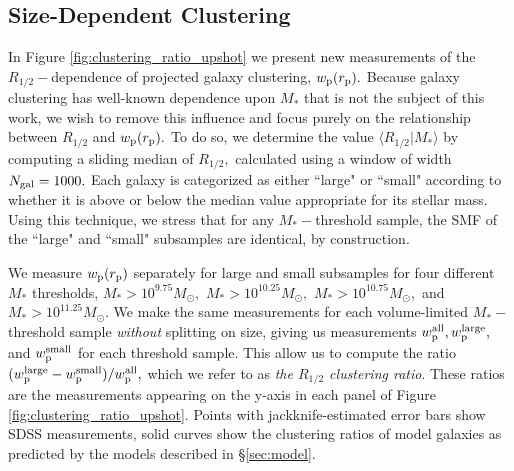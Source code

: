 \documentclass[usenatbib,usegraphicx,letterpaper]{mn2e}
\newcommand{\rhalf}{R_{1/2}}
\newcommand{\mstar}{M_{\ast}}
\newcommand{\rproj}{r_{\rm p}}
\newcommand{\wproj}{w_{\rm p}}
\newcommand{\wplarge}{w_{\rm p}^{\rm large}}
\newcommand{\wpsmall}{w_{\rm p}^{\rm small}}
\newcommand{\wpall}{w_{\rm p}^{\rm all}}
\newcommand{\msun}{M_\odot}
\begin{document}
\subsection{Size-Dependent Clustering}
\label{subsec:clustering_results}

In Figure \ref{fig:clustering_ratio_upshot} we present new measurements of the $\rhalf-$dependence of projected galaxy clustering, $\wproj(\rproj).$ Because galaxy clustering has well-known dependence upon $\mstar$ that is not the subject of this work, we wish to remove this influence and focus purely on the relationship between $\rhalf$ and $\wproj(\rproj).$ To do so, we determine the value $\langle\rhalf\vert\mstar\rangle$ by computing a sliding median of $\rhalf,$ calculated using a window of width $N_{\rm gal}=1000.$ Each galaxy is categorized as either ``large" or ``small" according to whether it is above or below the median value appropriate for its stellar mass. Using this technique, we stress that for any $\mstar-$threshold sample, the SMF of the ``large" and ``small" subsamples are identical, by construction.

We measure $\wproj(\rproj)$ separately for large and small subsamples for four different $\mstar$ thresholds, $\mstar>10^{9.75}\msun,$ $\mstar>10^{10.25}\msun,$ $\mstar>10^{10.75}\msun,$ and $\mstar>10^{11.25}\msun.$ We make the same measurements for each volume-limited $\mstar-$threshold sample {\em without} splitting on size, giving us measurements $\wpall, \wplarge,$ and $\wpsmall$ for each threshold sample. This allow us to compute the ratio $(\wplarge-\wpsmall)/\wpall,$ which we refer to as {\em the $\rhalf$ clustering ratio}. These ratios are the measurements appearing on the y-axis in each panel of Figure \ref{fig:clustering_ratio_upshot}. Points with jackknife-estimated error bars show SDSS measurements, solid curves show the clustering ratios of model galaxies as predicted by the models described in \S\ref{sec:model}.
\end{document}
